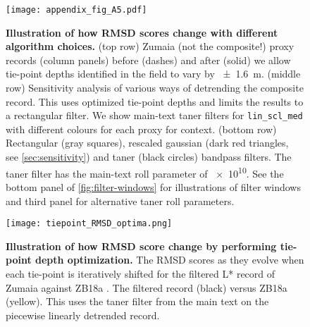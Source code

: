 \documentclass[]{agujournal2019}
\newcommand{\ijk}{\textcolor{blue}}
\begin{document}
\begin{figure}
  \centering \texttt{[image: appendix\_fig\_A5.pdf]}
  \caption{
    \textbf{Illustration of how RMSD scores change with different algorithm choices.}
    (top row)\label{fig:full-RMSD-tie}
    Zumaia (not the composite!) proxy records (column panels)
    before (dashes) and after (solid) we allow tie-point depths identified in the field to vary by \qty{\pm1.6}{\metre}.
    (middle row)\label{fig:full-RMSD-detrend} Sensitivity analysis of various ways of detrending the composite record.
    This uses optimized tie-point depths and limits the results to a rectangular filter.
    We show main-text taner filters for \texttt{lin\_scl\_med} with different colours for each proxy for context.
    (bottom row)\label{fig:full-RMSD-filter} Rectangular (gray squares), rescaled gaussian (dark red triangles, see \ref{sec:sensitivity}) and taner (black circles) bandpass filters.
    The taner filter has the main-text roll parameter of \num{e10}.
    See the bottom panel of \cref{fig:filter-windows} for illustrations of filter windows and third panel for alternative taner roll parameters.
    }
\end{figure}


\begin{figure}
  \centering \texttt{[image: tiepoint\_RMSD\_optima.png]}
  \caption{\label{fig:tiepoint-RMSD-optima}
    \textbf{Illustration of how RMSD score change by performing tie-point depth optimization.}
     The \gls{RMSD} scores as they evolve when each tie-point is iteratively shifted  for the filtered \gls{L*} record of Zumaia  against ZB18a .
     The filtered record (black) versus ZB18a (yellow).
    This uses the taner filter from the main text on the piecewise linearly detrended record.
    }
\end{figure}
\end{document}
